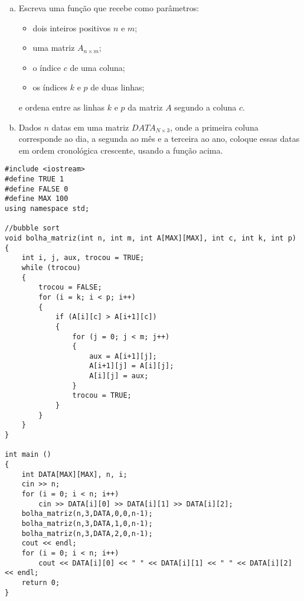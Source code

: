 \documentclass[a4paper]{memoir}
\begin{document}
\begin{prob}\label{prob313.cpp}
\begin{enumerate}[a)]
 \item Escreva uma função que recebe como parâmetros:

 \begin{itemize}
  \item dois inteiros positivos $n$ e $m$;
  \item uma matriz $A_{n \times m}$;
  \item o índice $c$ de uma coluna;
  \item os índices $k$ e $p$ de duas linhas;
 \end{itemize}
  e ordena entre as linhas $k$ e $p$ da matriz $A$ segundo a coluna $c$.

  \item Dados $n$ datas em uma matriz $DATA_{N \times 3}$, onde a primeira coluna corresponde ao dia, a segunda ao mês e a terceira ao ano, coloque essas datas em ordem cronológica crescente, usando a função acima.
\end{enumerate}

\end{prob}

\begin{sol}
\begin{lstlisting}
#include <iostream>
#define TRUE 1
#define FALSE 0
#define MAX 100
using namespace std;

//bubble sort
void bolha_matriz(int n, int m, int A[MAX][MAX], int c, int k, int p)
{
    int i, j, aux, trocou = TRUE;
    while (trocou)
    {
        trocou = FALSE;
        for (i = k; i < p; i++)
        {
            if (A[i][c] > A[i+1][c])
            {
                for (j = 0; j < m; j++)
                {
                    aux = A[i+1][j];
                    A[i+1][j] = A[i][j];
                    A[i][j] = aux;
                }
                trocou = TRUE;
            }
        }
    }
}

int main ()
{
    int DATA[MAX][MAX], n, i;
    cin >> n;
    for (i = 0; i < n; i++)
        cin >> DATA[i][0] >> DATA[i][1] >> DATA[i][2];
    bolha_matriz(n,3,DATA,0,0,n-1);
    bolha_matriz(n,3,DATA,1,0,n-1);
    bolha_matriz(n,3,DATA,2,0,n-1);
    cout << endl;
    for (i = 0; i < n; i++)
        cout << DATA[i][0] << " " << DATA[i][1] << " " << DATA[i][2] << endl;
    return 0;
}
\end{lstlisting}
\end{sol}
\end{document}
